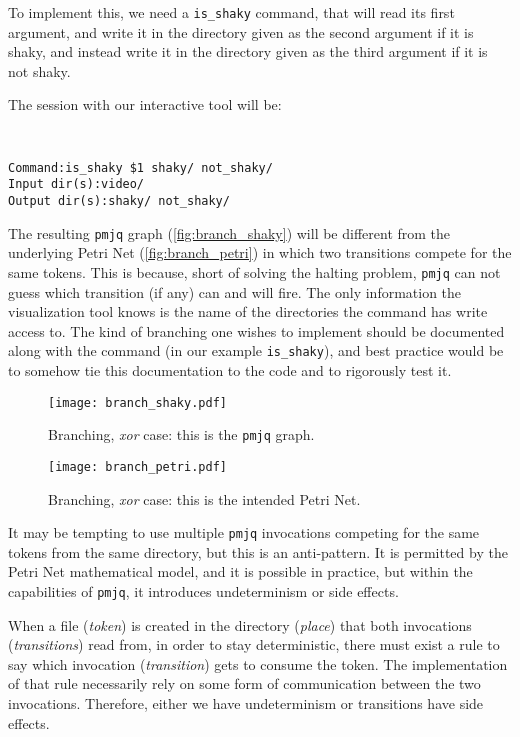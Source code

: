 \documentclass[letterpaper,twocolumn,10pt]{article}
\begin{document}
To implement this, we need a {\tt is\_shaky} command, that will read its first argument, and write it in the directory given as the second argument if it is shaky, and instead write it in the directory given as the third argument if it is not shaky.

The session with our interactive tool will be:
{\tt \small
\begin{verbatim}
Command:is_shaky $1 shaky/ not_shaky/
Input dir(s):video/
Output dir(s):shaky/ not_shaky/
\end{verbatim}
}

The resulting {\tt pmjq} graph (\autoref{fig:branch_shaky}) will be different from the underlying Petri Net (\autoref{fig:branch_petri}) in which two transitions compete for the same tokens. This is because, short of solving the halting problem, {\tt pmjq} can not guess which transition (if any) can and will fire. The only information the visualization tool knows is the name of the directories the command has write access to. The kind of branching one wishes to implement should be documented along with the command (in our example {\tt is\_shaky}), and best practice would be to somehow tie this documentation to the code and to rigorously test it.  

\begin{figure}[t]
\begin{center}
\texttt{[image: branch\_shaky.pdf]}
\end{center}
\caption{Branching, \emph{xor} case: this is the {\tt pmjq} graph.}
\label{fig:branch_shaky}
\end{figure}

\begin{figure}[t]
\begin{center}
\texttt{[image: branch\_petri.pdf]}
\end{center}
\caption{Branching, \emph{xor} case: this is the intended Petri Net.}
\label{fig:branch_petri}
\end{figure}

It may be tempting to use multiple {\tt pmjq} invocations competing for the same tokens from the same directory, but this is an anti-pattern. It is permitted by the Petri Net mathematical model, and it is possible in practice, but within the capabilities of {\tt pmjq}, it introduces undeterminism or side effects.

When a file (\emph{token}) is created in the directory (\emph{place}) that both invocations (\emph{transitions}) read from, in order to stay deterministic, there must exist a rule to say which invocation (\emph{transition}) gets to consume the token. The implementation of that rule necessarily rely on some form of communication between the two invocations. Therefore, either we have undeterminism or transitions have side effects.
\end{document}
